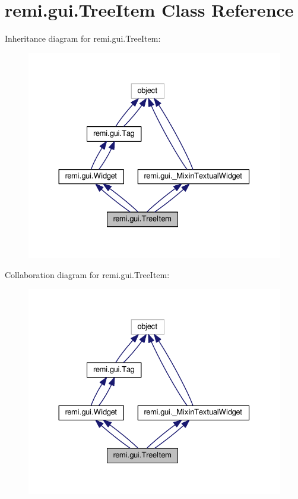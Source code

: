 \hypertarget{classremi_1_1gui_1_1TreeItem}{}\section{remi.\+gui.\+Tree\+Item Class Reference}
\label{classremi_1_1gui_1_1TreeItem}


Inheritance diagram for remi.\+gui.\+Tree\+Item\+:
\nopagebreak
\begin{figure}[H]
\begin{center}
\leavevmode
\includegraphics[width=330pt]{d1/d36/classremi_1_1gui_1_1TreeItem__inherit__graph}
\end{center}
\end{figure}


Collaboration diagram for remi.\+gui.\+Tree\+Item\+:
\nopagebreak
\begin{figure}[H]
\begin{center}
\leavevmode
\includegraphics[width=330pt]{d1/df6/classremi_1_1gui_1_1TreeItem__coll__graph}
\end{center}
\end{figure}
